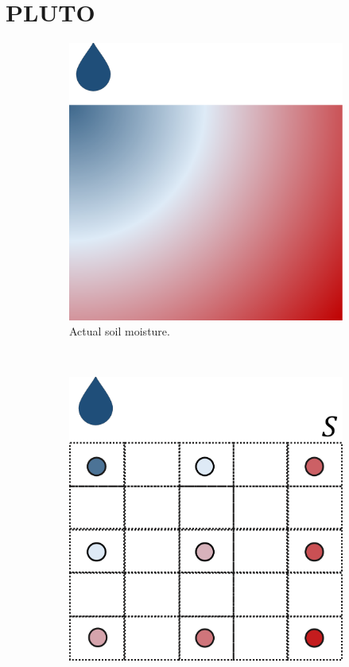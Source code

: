 \section{PLUTO}
\label{pluto-sec:MaterialsAndMethods}
\begin{figure}[t]
\centering
\begin{subfigure}[t]{.3\textwidth}
\centering
\includegraphics[scale=.15]{chapters/physics-aware/pluto/img/soil-moisture-continuous.pdf}
\caption{Actual soil moisture.}
\label{pluto-fig:moisture-cont}
\end{subfigure}~
\begin{subfigure}[t]{.3\textwidth}
\centering
\includegraphics[scale=.15]{chapters/physics-aware/pluto/img/soil-moisture-sample.pdf}

\end{subfigure}
\end{figure}
